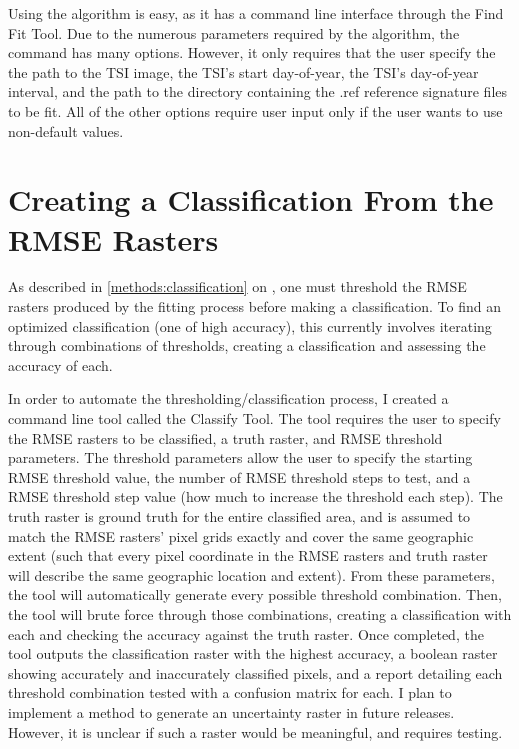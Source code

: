 Using the algorithm is easy, as it has a command line interface through the Find Fit Tool. Due to the numerous parameters required by the algorithm, the command has many options. However, it only requires that the user specify the the path to the TSI image, the TSI's start day-of-year, the TSI's day-of-year interval, and the path to the directory containing the .ref reference signature files to be fit. All of the other options require user input only if the user wants to use non-default values.


\section{Creating a Classification From the RMSE Rasters}
\label{appendix:tools:classify}

As described in \autoref{methods:classification} on , one must threshold the RMSE rasters produced by the fitting process before making a classification. To find an optimized classification (one of high accuracy), this currently involves iterating through combinations of thresholds, creating a classification and assessing the accuracy of each.

In order to automate the thresholding/classification process, I created a command line tool called the Classify Tool. The tool requires the user to specify the RMSE rasters to be classified, a truth raster, and RMSE threshold parameters. The threshold parameters allow the user to specify the starting RMSE threshold value, the number of RMSE threshold steps to test, and a RMSE threshold step value (how much to increase the threshold each step). The truth raster is ground truth for the entire classified area, and is assumed to match the RMSE rasters’ pixel grids exactly and cover the same geographic extent (such that every pixel coordinate in the RMSE rasters and truth raster will describe the same geographic location and extent). From these parameters, the tool will automatically generate every possible threshold combination. Then, the tool will brute force through those combinations, creating a classification with each and checking the accuracy against the truth raster. Once completed, the tool outputs the classification raster with the highest accuracy, a boolean raster showing accurately and inaccurately classified pixels, and a report detailing each threshold combination tested with a confusion matrix for each. I plan to implement a method to generate an uncertainty raster \autocite[see][pages 190-191]{eastman2012idrisi} in future releases. However, it is unclear if such a raster would be meaningful, and requires testing.